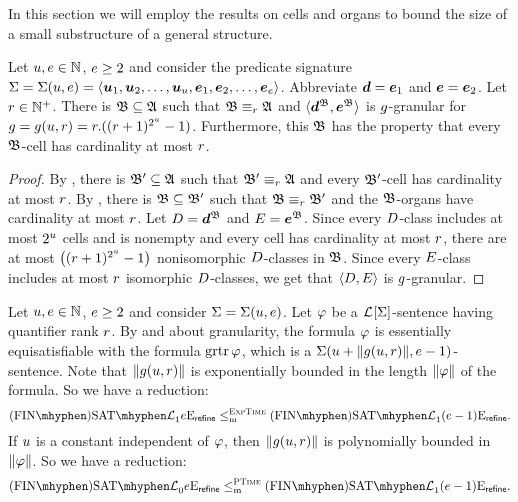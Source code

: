 
In this section we will employ the results on cells and organs to bound the size
of a small substructure of a general structure.

\begin{remark}\label{rem:monadic-granular}
Let $u, e \in \mathbb{N}$, $e \geq 2$ and consider the predicate
signature $\mathrm{\Sigma} = \mathrm{\Sigma}(u,e) =
\left\langle \bm{u}_{1},\bm{u}_{2},\dots,\bm{u}_{u},\bm{e}_{1},\bm{e}_{2},\dots,\bm{e}_{e} \right\rangle$.
Abbreviate $\bm{d} = \bm{e}_{1}$ and $\bm{e} = \bm{e}_{2}$.
Let $r \in \mathbb{N}^{+}$.
There is $\mathfrak{B} \subseteq \mathfrak{A}$ such that
$\mathfrak{B} \equiv_{r} \mathfrak{A}$ and $\langle \bm{d}^{\mathfrak{B}}, \bm{e}^{\mathfrak{B}} \rangle$ is
$g$-granular for $g = g(u,r) = r.((r+1)^{2^u}-1)$.
Furthermore, this $\mathfrak{B}$ has the property that every $\mathfrak{B}$-cell has
cardinality at most $r$.
\end{remark}
\begin{proof}
By , there is $\mathfrak{B'} \subseteq \mathfrak{A}$ such that
$\mathfrak{B'} \equiv_{r} \mathfrak{A}$ and every $\mathfrak{B'}$-cell has cardinality at most $r$.
By , there is $\mathfrak{B} \subseteq \mathfrak{B'}$ such that
$\mathfrak{B} \equiv_{r} \mathfrak{B'}$ and the $\mathfrak{B}$-organs have cardinality at most $r$.
Let $D = \bm{d}^{\mathfrak{B}}$ and $E = \bm{e}^{\mathfrak{B}}$.
Since every $D$-class includes at most $2^u$ cells and is
nonempty and every cell has cardinality at most $r$,
there are at most $\left((r+1)^{2^u}-1\right)$ nonisomorphic
$D$-classes in $\mathfrak{B}$.
Since every $E$-class includes at most $r$ isomorphic $D$-classes,
we get that $\left\langle D, E \right\rangle$ is $g$-granular.
\end{proof}
\begin{corollary}\label{cor:monadic-phi}
Let $u, e \in \mathbb{N}$, $e \geq 2$ and consider
$\mathrm{\Sigma} = \mathrm{\Sigma}(u,e)$.
Let $\varphi$ be a $\mathcal{L}^{{}}[\mathrm{\Sigma}]$-sentence having quantifier rank $r$.
By  and  about
granularity, the formula $\varphi$ is essentially equisatisfiable with the
formula $\operatorname{grtr}\varphi$, which is a
$\mathrm{\Sigma}(u + \|g(u,r)\|,e - 1)$-sentence.
Note that $\|g(u,r)\|$ is exponentially bounded in the length
$\|\varphi\|$ of the formula. So we have a reduction:
\[
  \FinASat\Lvp\Fo\nonv1\Eea\sze\agrefine \red\cExpTime
  \FinASat\Lvp\Fo\nonv1\Eea{(\sze-1)}\agrefine.
\]
If $u$ is a constant independent of $\varphi$, then $\|g(u,r)\|$ is
polynomially bounded in $\|\varphi\|$. So we have a reduction:
\[
  \FinASat\Lvp\Fo\nonv0\Eea\sze\agrefine \red\cP
  \FinASat\Lvp\Fo\nonv1\Eea{(\sze-1)}\agrefine.
\]
\end{corollary}

